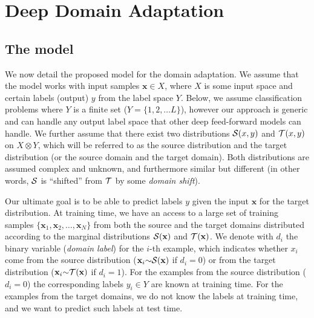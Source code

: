 \section{Deep Domain Adaptation}

\def\x{{\mathbf x}}
\def\f{{\mathbf f}}

\def\S{{\cal S}}
\def\T{{\cal T}}

\def\R{{\mathds R}}

\def\tf{{\theta_f}}
\def\td{{\theta_d}}
\def\ty{{\theta_y}}
\def\htf{{\hat\theta_f}}
\def\htd{{\hat\theta_d}}
\def\hty{{\hat\theta_y}}

\subsection{The model}

We now detail the proposed model for the domain adaptation. We assume that the model works with input samples $\x \in X$, where $X$ is some input space and certain labels (output) $y$ from the label space $Y$. Below, we assume classification problems where $Y$ is a finite set ($Y=\{1,2,\dots L\}$), however our approach is generic and can handle any output label space that other deep feed-forward models can handle. We further assume that there exist two distributions $\S(x,y)$ and $\T(x,y)$ on $X\otimes Y$, which will be referred to as the source distribution and the target distribution (or the source domain and the target domain). Both distributions are assumed complex and unknown, and furthermore similar but different (in other words, $\S$ is ``shifted'' from $\T$ by some {\em domain shift}). 

Our ultimate goal is to be able to predict labels $y$ given the input $\x$ for the target distribution. At training time, we have an access to a large set of training samples $\{\x_1,\x_2,\dots,\x_N\}$ from both the source and the target domains distributed according to the marginal distributions $\S(\x)$ and $\T(\x)$. We denote with $d_i$ the binary variable ({\em domain label}) for the $i$-th example, which indicates whether $x_i$ come from the source distribution ($\x_i{\sim}\S(\x)$ if $d_i{=}0$) or from the target distribution ($\x_i{\sim}\T(\x)$ if $d_i{=}1$). For the examples from the source distribution ($d_i{=}0$) the corresponding labels $y_i \in Y$ are known at training time. For the examples from the target domains, we do not know the labels at training time, and we want to predict such labels at test time.

